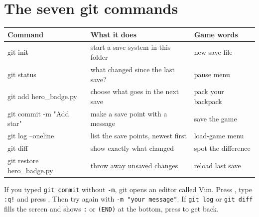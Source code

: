 \section{The seven git commands}
\begin{center}
\renewcommand{\arraystretch}{1.25}
\begin{tabular}{@{}>{\ttfamily}l p{5.6cm} p{3.6cm}@{}}
\toprule
\normalfont\textbf{Command} & \textbf{What it does} & \textbf{Game words} \\ \midrule
git init & start a save system in this folder & new save file \\
git status & what changed since the last save? & pause menu \\
git add hero\_badge.py & choose what goes in the next save & pack your backpack \\
git commit -m "Add star" & make a save point with a message & save the game \\
git log --oneline & list the save points, newest first & load-game menu \\
git diff & show exactly what changed & spot the difference \\
git restore hero\_badge.py & throw away unsaved changes & reload last save \\
\bottomrule
\end{tabular}
\end{center}

\begin{tip}
If you typed \texttt{git commit} without \texttt{-m}, git opens an editor called Vim. Press , type \texttt{:q!} and press . Then try again with \texttt{-m "your message"}.
If \texttt{git log} or \texttt{git diff} fills the screen and shows \texttt{:} or \texttt{(END)} at the bottom, press  to get back.
\end{tip}

